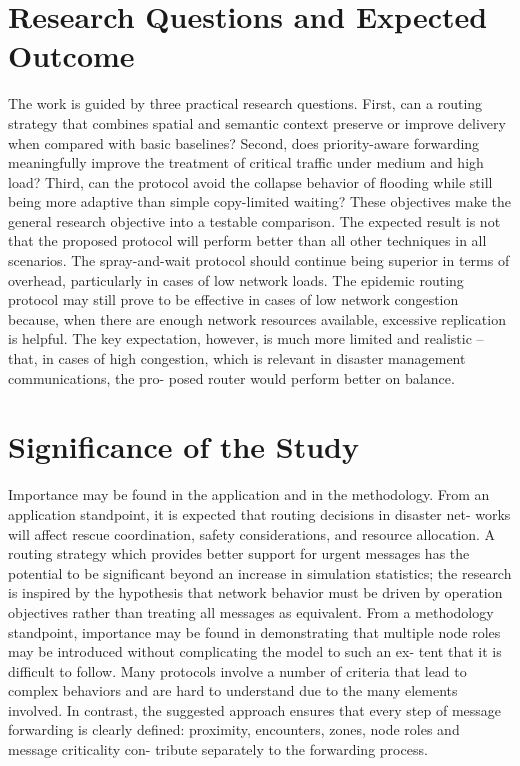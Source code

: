 \section{Research Questions and Expected Outcome}
The work is guided by three practical research questions. First, can a routing strategy that combines spatial and semantic context preserve or improve delivery when compared with basic baselines? Second, does priority-aware forwarding meaningfully improve the treatment of critical traffic under medium and high load? Third, can the protocol avoid the collapse behavior of flooding while still being more adaptive than simple copy-limited waiting? These objectives make the general research objective
into a testable comparison.
The expected result is not that the proposed protocol will perform better than all other
techniques in all scenarios. The spray-and-wait protocol should continue being superior
in terms of overhead, particularly in cases of low network loads. The epidemic routing
protocol may still prove to be effective in cases of low network congestion because,
when there are enough network resources available, excessive replication is helpful.
The key expectation, however, is much more limited and realistic – that, in cases of
high congestion, which is relevant in disaster management communications, the pro-
posed router would perform better on balance.
\section{Significance of the Study}

Importance may be found in the application and in the methodology.
From an application standpoint, it is expected that routing decisions in disaster net-
works will affect rescue coordination, safety considerations, and resource allocation. A
routing strategy which provides better support for urgent messages has the potential
to be significant beyond an increase in simulation statistics; the research is inspired
by the hypothesis that network behavior must be driven by operation objectives
rather than treating all messages as equivalent.
From a methodology standpoint, importance may be found in demonstrating that
multiple node roles may be introduced without complicating the model to such an ex-
tent that it is difficult to follow. Many protocols involve a number of criteria that lead
to complex behaviors and are hard to understand due to the many elements involved.
In contrast, the suggested approach ensures that every step of message forwarding
is clearly defined: proximity, encounters, zones, node roles and message criticality con-
tribute separately to the forwarding process.

